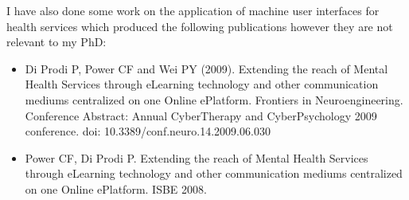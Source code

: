 I have also done some work on the application of machine user interfaces for
health services which produced the following publications however they are not relevant
to my PhD:
\begin{itemize}
\item Di Prodi P, Power CF and Wei PY (2009). Extending the reach of Mental
Health Services through eLearning technology and other communication mediums
centralized on one Online ePlatform. Frontiers in Neuroengineering. Conference
Abstract: Annual CyberTherapy and CyberPsychology 2009 conference. doi:
10.3389/conf.neuro.14.2009.06.030

\item Power CF, Di Prodi P. Extending the reach of Mental Health Services
through eLearning technology and other communication mediums centralized on one
Online ePlatform. ISBE 2008.

\end{itemize}
